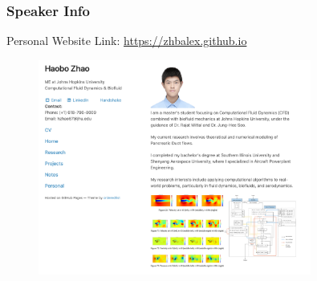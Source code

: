\documentclass{beamer}
\begin{document}
\begin{frame}
    \fontsize{8pt}{10pt}\selectfont
    \frametitle{Speaker Info }


    Personal Website Link: \href{https://zhbalex.github.io}{https://zhbalex.github.io}


    \begin{figure}[H]
        \centering
        \includegraphics[width=0.8\textwidth]{figures/Speaker_info.jpg}

    \end{figure}



    
\end{frame}
\end{document}
